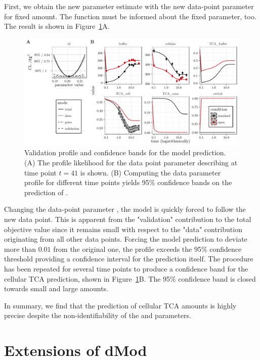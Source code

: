 \documentclass[article]{jss}
\begin{document}
First, we obtain the new parameter estimate  with the new data-point parameter  for fixed  amount. The  function must be informed about the fixed parameter, too. The result is shown in Figure~\ref{fig:validation}A.  

\begin{figure}[ht]
	\centering
	\includegraphics[width = \textwidth]{images/figure9_mod}
	\caption{Validation profile and confidence bands for the model prediction. (A) The profile likelihood for the data point parameter  describing  at time point $t = 41$ is shown. (B) Computing the data parameter profile for different time points yields 95\% confidence bands on the prediction of .}
	\label{fig:validation}
\end{figure}

Changing the data-point parameter , the model is quickly forced to follow the new data point. This is apparent from the "validation" contribution to the total objective value since it remains small with respect to the "data" contribution originating from all other data points. Forcing the model prediction to deviate more than $0.01$ from the original one, the profile exceeds the 95\% confidence threshold providing a confidence interval for the prediction itself. The procedure has been repeated for several time points to produce a confidence band for the cellular TCA prediction, shown in Figure~\ref{fig:validation}B. The 95\% confidence band is closed towards small and large amounts. 

In summary, we find that the prediction of cellular TCA amounts is highly precise despite the non-identifiability of the  and  parameters.

\section{Extensions of dMod}
\label{sec:extensions}

{}
\end{document}
